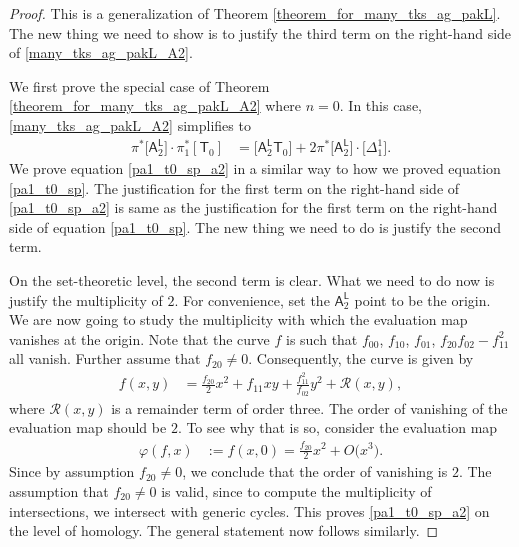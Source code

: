 \documentclass[pdftex]{sigma}
\numberwithin{equation}{section}
\begin{document}
\begin{proof}
This is a generalization of Theorem \ref{theorem_for_many_tks_ag_pakL}.
The new thing we need to show is to
justify the third term on the right-hand side of \eqref{many_tks_ag_pakL_A2}.

We first prove the special case of Theorem \ref{theorem_for_many_tks_ag_pakL_A2} where $n = 0$. In
this case, \eqref{many_tks_ag_pakL_A2} simplifies to
\begin{align}
\pi^*\bigl[\mathsf{A}_2^{\mathsf{L}}\bigr] \cdot \pi_1^*[\mathsf{T}_0] & =  \bigl[\mathsf{A}_2^{\mathsf{L}} \mathsf{T}_0\bigr] +
2 \pi^*\bigl[\mathsf{A}_2^{\mathsf{L}}\bigr]\cdot \bigl[\Delta_{1}^1\bigr]. \label{pa1_t0_sp_a2}
\end{align}
We prove equation \eqref{pa1_t0_sp_a2} in a similar way to how we proved
equation \eqref{pa1_t0_sp}. The justification for the first term on the
right-hand side of \eqref{pa1_t0_sp_a2} is same as the justification for the first term on the
right-hand side of equation \eqref{pa1_t0_sp}. The new thing we need to do is justify the
second term.

On the set-theoretic level, the second term is clear. What we need to do now is justify the multiplicity
of $2$.
For convenience, set the $\mathsf{A}_2^{\mathsf{L}}$ point to
be the origin. We are now going to
study the multiplicity with which the evaluation map vanishes at the origin.
Note that the curve $f$ is such that $f_{00}$, $f_{10}$, $f_{01}$, $f_{20}f_{02} - f_{11}^2$ all vanish.
Further assume that $f_{20} \neq 0$. Consequently, the curve is given by
\begin{align*}
f(x, y)& = \frac{f_{20}}{2} x^2 + f_{11} xy + \frac{f_{11}^2}{f_{02}} y^2 + \mathcal{R}(x, y),
\end{align*}
where $\mathcal{R}(x, y)$ is a remainder term of order three. The order of vanishing of the evaluation map should be $2$.
To see why that is so, consider the evaluation map
\begin{align*}
\varphi(f, x)& := f(x, 0) = \frac{f_{20}}{2} x^2 + O\bigl(x^3\bigr).
\end{align*}
Since by assumption $f_{20} \neq 0$, we conclude that the order of vanishing is $2$. The assumption that
$f_{20} \neq 0$ is valid, since to compute the multiplicity of intersections, we intersect with generic cycles.
This proves \eqref{pa1_t0_sp_a2} on the level of homology. The general statement now follows similarly.
\end{proof}
\end{document}
